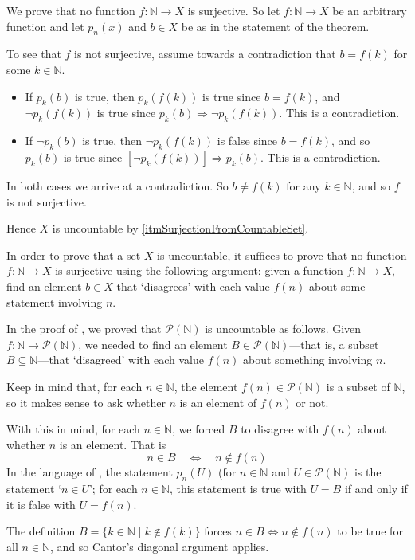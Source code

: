 \begin{cproof}
We prove that no function $f : \mathbb{N} \to X$ is surjective. So let $f : \mathbb{N} \to X$ be an arbitrary function and let $p_n(x)$ and $b \in X$ be as in the statement of the theorem.

To see that $f$ is not surjective, assume towards a contradiction that $b=f(k)$ for some $k \in \mathbb{N}$.
\begin{itemize}
\item If $p_k(b)$ is true, then $p_k(f(k))$ is true since $b=f(k)$, and $\neg p_k(f(k))$ is true since $p_k(b) \Rightarrow \neg p_k(f(k))$. This is a contradiction.
\item If $\neg p_k(b)$ is true, then $\neg p_k(f(k))$ is false since $b=f(k)$, and so $p_k(b)$ is true since $[\neg p_k(f(k))] \Rightarrow p_k(b)$. This is a contradiction. 
\end{itemize}
In both cases we arrive at a contradiction. So $b \ne f(k)$ for any $k \in \mathbb{N}$, and so $f$ is not surjective.

Hence $X$ is uncountable by \ref{itmSurjectionFromCountableSet}.
\end{cproof}

\begin{strategy}
\label{strCantorDiagonal}
In order to prove that a set $X$ is uncountable, it suffices to prove that no function $f : \mathbb{N} \to X$ is surjective using the following argument: given a function $f : \mathbb{N} \to X$, find an element $b \in X$ that `disagrees' with each value $f(n)$ about some statement involving $n$.
\end{strategy}

\begin{example}
In the proof of , we proved that $\mathcal{P}(\mathbb{N})$ is uncountable as follows. Given $f : \mathbb{N} \to \mathcal{P}(\mathbb{N})$, we needed to find an element $B \in \mathcal{P}(\mathbb{N})$---that is, a subset $B \subseteq \mathbb{N}$---that `disagreed' with each value $f(n)$ about something involving $n$.

Keep in mind that, for each $n \in \mathbb{N}$, the element $f(n) \in \mathcal{P}(\mathbb{N})$ is a subset of $\mathbb{N}$, so it makes sense to ask whether $n$ is an element of $f(n)$ or not.

With this in mind, for each $n \in \mathbb{N}$, we forced $B$ to disagree with $f(n)$ about whether $n$ is an element. That is
\[ n \in B \quad \Leftrightarrow \quad n \not\in f(n) \]
In the language of , the statement $p_n(U)$ (for $n \in \mathbb{N}$ and $U \in \mathcal{P}(\mathbb{N})$ is the statement `$n \in U$'; for each $n \in \mathbb{N}$, this statement is true with $U=B$ if and only if it is false with $U=f(n)$.

The definition $B = \{ k \in \mathbb{N} \mid k \not\in f(k) \}$ forces $n \in B \Leftrightarrow n \not\in f(n)$ to be true for all $n \in \mathbb{N}$, and so Cantor's diagonal argument applies.
\end{example}


